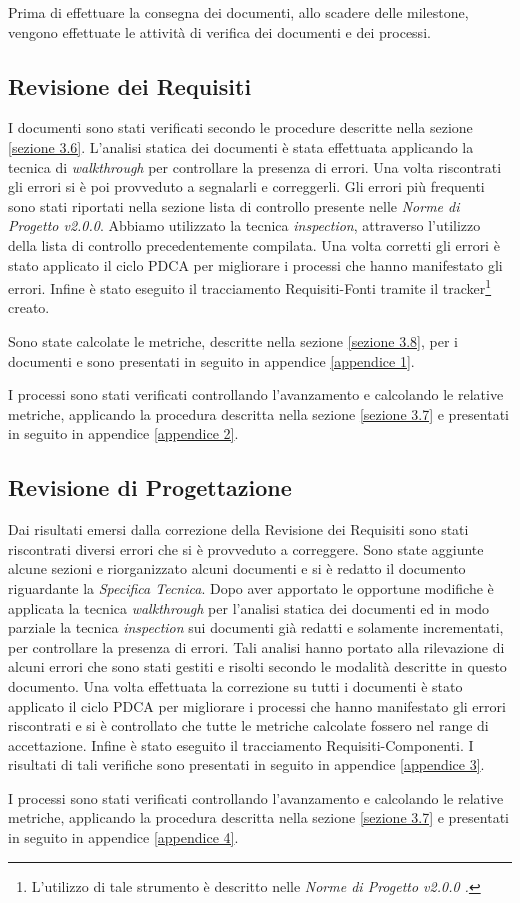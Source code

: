 Prima di effettuare la consegna dei documenti, allo scadere delle \gls{milestone}, vengono effettuate le attività di verifica dei documenti e dei processi.

\subsection{Revisione dei Requisiti}

\noindent I documenti sono stati verificati secondo le procedure descritte nella sezione \ref{sezione 3.6}.
L'analisi statica dei documenti è stata effettuata applicando la tecnica di \textit{\gls{walkthrough}} per controllare la presenza di errori. Una volta riscontrati gli errori si è poi provveduto a segnalarli e correggerli. Gli errori più frequenti sono stati riportati nella sezione lista di controllo presente nelle \textit{Norme di Progetto v2.0.0}. Abbiamo utilizzato la tecnica \textit{\gls{inspection}}, attraverso l'utilizzo della lista di controllo precedentemente compilata. Una volta corretti gli errori è stato applicato il ciclo \gls{PDCA} per migliorare i processi che hanno manifestato gli errori. Infine è stato eseguito il tracciamento Requisiti-Fonti tramite il tracker\footnote{L'utilizzo di tale strumento è descritto nelle \textit{Norme di Progetto v2.0.0 .}} creato. 

\noindent Sono state calcolate le metriche, descritte nella sezione \ref{sezione 3.8}, per i documenti e sono presentati in seguito in appendice \ref{appendice 1}. 

\noindent I processi sono stati verificati controllando l'avanzamento e calcolando le relative metriche, applicando la procedura descritta nella sezione \ref{sezione 3.7} e presentati in seguito in appendice \ref{appendice 2}.

\subsection{Revisione di Progettazione}

Dai risultati emersi dalla correzione della Revisione dei Requisiti sono stati riscontrati diversi errori che si è provveduto a correggere.
Sono state aggiunte alcune sezioni e riorganizzato alcuni documenti e si è redatto il documento riguardante la \textit{Specifica Tecnica}.
Dopo aver apportato le opportune modifiche è applicata la tecnica \textit{\gls{walkthrough}} per l'analisi statica dei documenti ed in modo parziale la tecnica \textit{\gls{inspection}} sui documenti già redatti e solamente incrementati, per controllare la presenza di errori. Tali analisi hanno portato alla rilevazione di alcuni errori che sono stati gestiti e risolti secondo le modalità descritte in questo documento. Una volta effettuata la correzione su tutti i documenti è stato applicato il ciclo \gls{PDCA} per migliorare i processi che hanno manifestato gli errori riscontrati e si è controllato che tutte le metriche calcolate fossero nel range di accettazione. Infine è stato eseguito il tracciamento Requisiti-Componenti. I risultati di tali verifiche sono presentati in seguito in appendice \ref{appendice 3}.

\noindent I processi sono stati verificati controllando l'avanzamento e calcolando le relative metriche, applicando la procedura descritta nella sezione \ref{sezione 3.7} e presentati in seguito in appendice \ref{appendice 4}.

